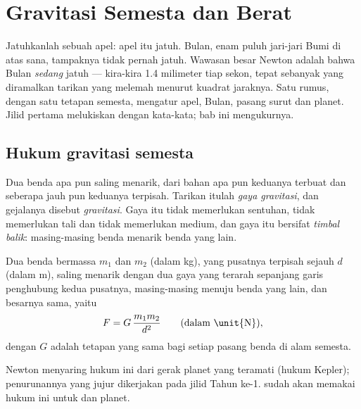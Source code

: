 \chapter{Gravitasi Semesta dan Berat}\label{ch:g10:universal-gravitation}

Jatuhkanlah sebuah apel: apel itu jatuh. Bulan, enam puluh jari-jari
Bumi di atas sana, tampaknya tidak pernah jatuh. Wawasan besar Newton
adalah bahwa Bulan \emph{sedang} jatuh --- kira-kira 1.4 milimeter tiap
sekon, tepat sebanyak yang diramalkan tarikan yang melemah menurut
kuadrat jaraknya. Satu rumus, dengan satu tetapan semesta, mengatur
apel, Bulan, pasang surut dan planet. Jilid pertama melukiskan 
dengan kata-kata; bab ini mengukurnya.

\section{Hukum gravitasi semesta}

\begin{definition}\label{def:g10:universal-gravitation:force}
Dua benda apa pun saling menarik, dari bahan apa pun keduanya terbuat
dan seberapa jauh pun keduanya terpisah. Tarikan itulah \emph{gaya
gravitasi}, dan gejalanya disebut
\emph{gravitasi}. Gaya itu tidak memerlukan sentuhan,
tidak memerlukan tali dan tidak memerlukan medium, dan gaya itu bersifat
\emph{timbal balik}: masing-masing benda menarik benda yang lain.
\end{definition}

\begin{theorem}\label{thm:g10:universal-gravitation:law}
Dua benda bermassa $m_1$ dan $m_2$ (dalam \unit{kg}), yang pusatnya
terpisah sejauh $d$ (dalam \unit{m}), saling menarik dengan dua gaya
yang terarah sepanjang garis penghubung kedua pusatnya, masing-masing
menuju benda yang lain, dan besarnya sama, yaitu
\[
F = G\,\frac{m_1 m_2}{d^2}
\qquad \text{(dalam \unit{N})},
\]
dengan $G$ adalah tetapan yang sama bagi setiap pasang benda di alam
semesta.
\end{theorem}
\admitted

\begin{remark}
Newton menyaring hukum ini dari gerak planet yang teramati (hukum
Kepler); penurunannya yang jujur dikerjakan pada jilid Tahun ke-1.
 sudah akan memakai hukum ini untuk
 dan planet.
\end{remark}

